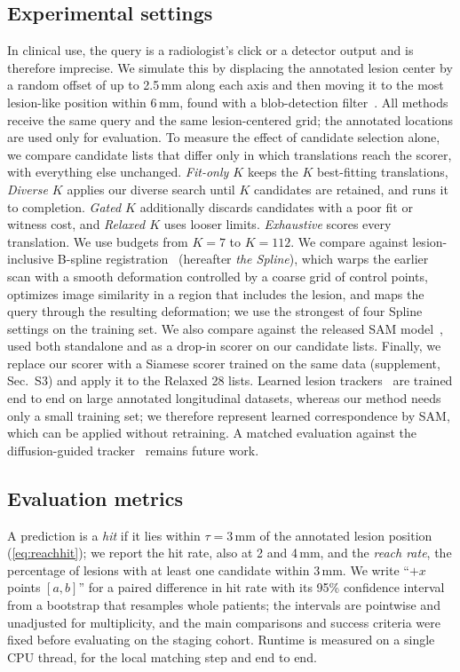 \subsection{Experimental settings}
In clinical use, the query is a radiologist's click or a detector output and is therefore imprecise.
We simulate this by displacing the annotated lesion center by a random offset of up to 2.5\,mm along each axis and then moving it to the most lesion-like position within 6\,mm, found with a blob-detection filter~\cite{li2003selective}.
All methods receive the same query and the same lesion-centered grid; the annotated locations are used only for evaluation. To measure the effect of candidate selection alone, we compare candidate lists that differ only in which translations reach the scorer, with everything else unchanged.
\emph{Fit-only $K$} keeps the $K$ best-fitting translations, \emph{Diverse $K$} applies our diverse search until $K$ candidates are retained, and \emph{\ours} runs it to completion.
\emph{Gated $K$} additionally discards candidates with a poor fit or witness cost, and \emph{Relaxed $K$} uses looser limits.
\emph{Exhaustive} scores every translation.
We use budgets from $K = 7$ to $K = 112$. We compare against lesion-inclusive B-spline registration~\cite{lowekamp2013} (hereafter \emph{the Spline}), which warps the earlier scan with a smooth deformation controlled by a coarse grid of control points, optimizes image similarity in a region that includes the lesion, and maps the query through the resulting deformation; we use the strongest of four Spline settings on the training set.
We also compare against the released SAM model~\cite{yan2022sam}, used both standalone and as a drop-in scorer on our candidate lists.
Finally, we replace our scorer with a Siamese scorer trained on the same data (supplement, Sec.~S3) and apply it to the Relaxed 28 lists.
Learned lesion trackers~\cite{cai2021,tang2022tlt} are trained end to end on large annotated longitudinal datasets, whereas our method needs only a small training set; we therefore represent learned correspondence by SAM, which can be applied without retraining. A matched evaluation against the diffusion-guided tracker~\cite{zhuang2026diffusion} remains future work.

\subsection{Evaluation metrics}
A prediction is a \emph{hit} if it lies within $\tau = 3$\,mm of the annotated lesion position (\cref{eq:reachhit}); we report the hit rate, also at 2 and 4\,mm, and the \emph{reach rate}, the percentage of lesions with at least one candidate within 3\,mm.
We write ``$+x$ points $[a, b]$'' for a paired difference in hit rate with its 95\% confidence interval from a bootstrap that resamples whole patients; the intervals are pointwise and unadjusted for multiplicity, and the main comparisons and success criteria were fixed before evaluating on the staging cohort.
Runtime is measured on a single CPU thread, for the local matching step and end to end.

